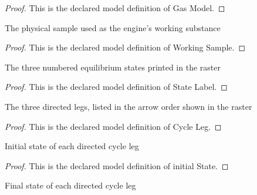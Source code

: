 \begin{proof}
  This is the declared model definition of Gas Model.
\end{proof}
\begin{definition}
  \label{def:physics:phyx-mini-0432:phyxminiproblems-problemphyxmini0432-workingsample}
  The physical sample used as the engine's working substance
\end{definition}
\begin{proof}
  This is the declared model definition of Working Sample.
\end{proof}
\begin{definition}
  \label{def:physics:phyx-mini-0432:phyxminiproblems-problemphyxmini0432-statelabel}
  The three numbered equilibrium states printed in the raster
\end{definition}
\begin{proof}
  This is the declared model definition of State Label.
\end{proof}
\begin{definition}
  \label{def:physics:phyx-mini-0432:phyxminiproblems-problemphyxmini0432-cycleleg}
  The three directed legs, listed in the arrow order shown in the raster
\end{definition}
\begin{proof}
  This is the declared model definition of Cycle Leg.
\end{proof}
\begin{definition}
  \label{def:physics:phyx-mini-0432:phyxminiproblems-problemphyxmini0432-cycleleg-initialstate}
  Initial state of each directed cycle leg
\end{definition}
\begin{proof}
  This is the declared model definition of initial State.
\end{proof}
\begin{definition}
  \label{def:physics:phyx-mini-0432:phyxminiproblems-problemphyxmini0432-cycleleg-finalstate}
  Final state of each directed cycle leg
\end{definition}
